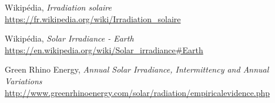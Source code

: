 \documentclass[12pt]{article}
\begin{document}
\begin{thebibliography}{99}
	Wikipédia,
	\emph{Irradiation solaire}\\
	\url{https://fr.wikipedia.org/wiki/Irradiation_solaire}
	
	Wikipédia,
	\emph{Solar Irradiance - Earth}\\
	\url{https://en.wikipedia.org/wiki/Solar_irradiance#Earth}
	
	Green Rhino Energy,
	\emph{Annual Solar Irradiance, Intermittency and Annual Variations}\\
	\url{http://www.greenrhinoenergy.com/solar/radiation/empiricalevidence.php}

\end{thebibliography}
\end{document}
